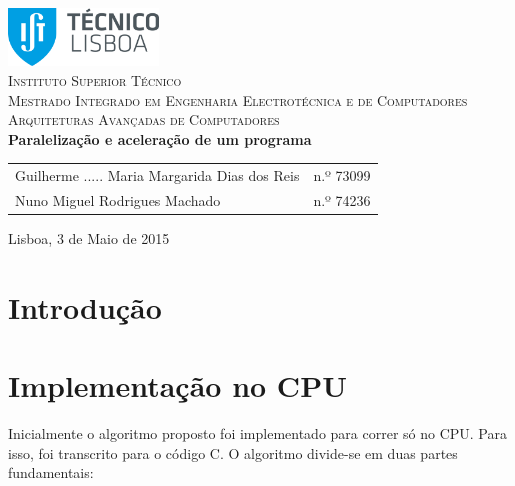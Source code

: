 \documentclass[11pt]{article}
\numberwithin{equation}{section}
\begin{document}
\begin{titlepage}
\begin{center}

\hfill \break
\hfill \break

\includegraphics[width=0.3\textwidth]{./logo}~\\[1cm]

\textsc{\LARGE Instituto Superior Técnico}\\[0.25cm]
\textsc{\Large Mestrado Integrado em Engenharia Electrotécnica e de Computadores}\\[1.8cm]
\textsc{\huge Arquiteturas Avançadas de Computadores}\\[0.25cm]

{\huge \bfseries Paralelização e aceleração de um programa\\[2cm]}

\begin{tabular}{ l l }
Guilherme .....
Maria Margarida Dias dos Reis & \hspace{2mm} n.º 73099 \\
Nuno Miguel Rodrigues Machado & \hspace{2mm} n.º 74236
\end{tabular}

\vfill

{\large Lisboa, 3 de Maio de 2015} 

\end{center}
\end{titlepage}

\clearpage

\tableofcontents
\pagebreak

\clearpage
{}

\section{Introdução}

\section{Implementação no CPU }
Inicialmente o algoritmo proposto foi implementado para correr só no CPU. Para isso, foi transcrito para o código C.
O algoritmo divide-se em duas partes fundamentais:
\end{document}
